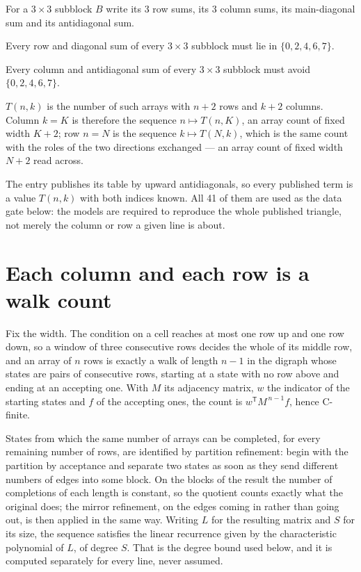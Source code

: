 \documentclass[11pt]{article}
\theoremstyle{definition}
\begin{document}
For a $3\times3$ subblock $B$ write its 3 row sums, its 3 column sums, its main-diagonal sum and its antidiagonal sum.

Every row and diagonal sum of every $3\times3$ subblock must lie in $\{0, 2, 4, 6, 7\}$.

Every column and antidiagonal sum of every $3\times3$ subblock must avoid $\{0, 2, 4, 6, 7\}$.

$T(n,k)$ is the number of such arrays with $n + 2$ rows and $k + 2$ columns. Column $k = K$ is therefore the sequence $n \mapsto T(n,K)$, an array count of fixed width $K + 2$; row $n = N$ is the sequence $k \mapsto T(N,k)$, which is the same count with the roles of the two directions exchanged --- an array count of fixed width $N + 2$ read across.

The entry publishes its table by upward antidiagonals, so every published term is a value $T(n,k)$ with both indices known. All 41 of them are used as the data gate below: the models are required to reproduce the whole published triangle, not merely the column or row a given line is about.

\section{Each column and each row is a walk count}

Fix the width. The condition on a cell reaches at most one row up and one row down, so a window of three consecutive rows decides the whole of its middle row, and an array of $n$ rows is exactly a walk of length $n-1$ in the digraph whose states are pairs of consecutive rows, starting at a state with no row above and ending at an accepting one. With $M$ its adjacency matrix, $w$ the indicator of the starting states and $f$ of the accepting ones, the count is $w^{\mathsf T}M^{\,n-1}f$, hence C-finite.

States from which the same number of arrays can be completed, for every remaining number of rows, are identified by partition refinement: begin with the partition by acceptance and separate two states as soon as they send different numbers of edges into some block. On the blocks of the result the number of completions of each length is constant, so the quotient counts exactly what the original does; the mirror refinement, on the edges coming in rather than going out, is then applied in the same way. Writing $L$ for the resulting matrix and $S$ for its size, the sequence satisfies the linear recurrence given by the characteristic polynomial of $L$, of degree $S$. That is the degree bound used below, and it is computed separately for every line, never assumed.
\end{document}
